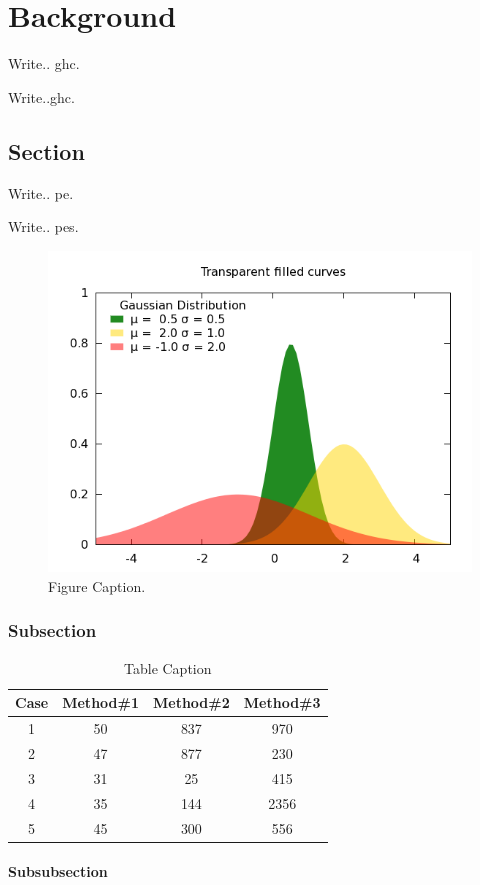

\chapter{Background}
\label{ch:background}


Write.. \gls{ghc}.

Write..\gls{ghc}.


\section{Section}

Write.. \gls{pe}.

Write.. \glspl{pe}.

\begin{figure}[h]
 \begin{center}
 \includegraphics [width=12cm]{Figures/Background/pic.png}
 \caption{Figure Caption.}
 \label{fig:label}
\end{center}
\end{figure} 

\cite{gum, ghc-smp}

\subsection{Subsection}

\begin{table}[h]
\begin{center}
\begin{tabular}{c c c c} %
\hline\hline %
Case & Method\#1 & Method\#2 & Method\#3 \\ [0.5ex] %
\hline %
1 & 50 & 837 & 970 \\ %
2 & 47 & 877 & 230 \\
3 & 31 & 25 & 415 \\
4 & 35 & 144 & 2356 \\
5 & 45 & 300 & 556 \\ [1ex] %
\hline %
\end{tabular}\caption{Table Caption}
\label{tab:lable}
\end{center}
\end{table}


\subsubsection{Subsubsection}